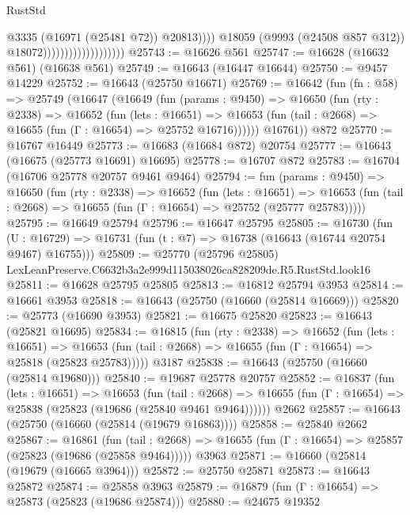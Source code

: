 \begin{lexlean}{RustStd}
\begin{coremodule}
                                                  @3335
                                                  (@16971 (@25481 @72))
                                                  @20813))))
                                          @18059
                                          (@9993 (@24508 @857 @312))
                                          @18072)))))))))))))))))))
@25743 := @16626 @561
@25747 := @16628 (@16632 @561) (@16638 @561)
@25749 := @16643 (@16447 @16644)
@25750 := @9457 @14229
@25752 := @16643 (@25750 @16671)
@25769 := @16642
    (fun (fn : @58) =>
    @25749
      (@16647
        (@16649
          (fun (params : @9450) =>
          @16650
            (fun (rty : @2338) =>
            @16652
              (fun (lets : @16651) =>
              @16653 (fun (tail : @2668) => @16655 (fun (Γ : @16654) => @25752 @16716))))))
        @16761))
    @872
@25770 := @16767 @16449
@25773 := @16683 (@16684 @872) @20754
@25777 := @16643 (@16675 (@25773 @16691) @16695)
@25778 := @16707 @872
@25783 := @16704 (@16706 @25778 @20757 @9461 @9464)
@25794 := fun (params : @9450) =>
  @16650
    (fun (rty : @2338) =>
    @16652
      (fun (lets : @16651) =>
      @16653 (fun (tail : @2668) => @16655 (fun (Γ : @16654) => @25752 (@25777 @25783)))))
@25795 := @16649 @25794
@25796 := @16647 @25795
@25805 := @16730
    (fun (U : @16729) => @16731 (fun (t : @7) => @16738 (@16643 (@16744 @20754 @9467) @16755)))
@25809 := @25770 (@25796 @25805) LexLeanPreserve.C6632b3a2e999d115038026ca828209de.R5.RustStd.look16
@25811 := @16628 @25795 @25805
@25813 := @16812 @25794 @3953
@25814 := @16661 @3953
@25818 := @16643 (@25750 (@16660 (@25814 @16669)))
@25820 := @25773 (@16690 @3953)
@25821 := @16675 @25820
@25823 := @16643 (@25821 @16695)
@25834 := @16815
    (fun (rty : @2338) =>
    @16652
      (fun (lets : @16651) =>
      @16653 (fun (tail : @2668) => @16655 (fun (Γ : @16654) => @25818 (@25823 @25783)))))
    @3187
@25838 := @16643 (@25750 (@16660 (@25814 @19680)))
@25840 := @19687 @25778 @20757
@25852 := @16837
    (fun (lets : @16651) =>
    @16653
      (fun (tail : @2668) =>
      @16655 (fun (Γ : @16654) => @25838 (@25823 (@19686 (@25840 @9461 @9464))))))
    @2662
@25857 := @16643 (@25750 (@16660 (@25814 (@19679 @16863))))
@25858 := @25840 @2662
@25867 := @16861
    (fun (tail : @2668) => @16655 (fun (Γ : @16654) => @25857 (@25823 (@19686 (@25858 @9464)))))
    @3963
@25871 := @16660 (@25814 (@19679 (@16665 @3964)))
@25872 := @25750 @25871
@25873 := @16643 @25872
@25874 := @25858 @3963
@25879 := @16879 (fun (Γ : @16654) => @25873 (@25823 (@19686 @25874)))
@25880 := @24675 @19352

\end{coremodule}
\end{lexlean}
